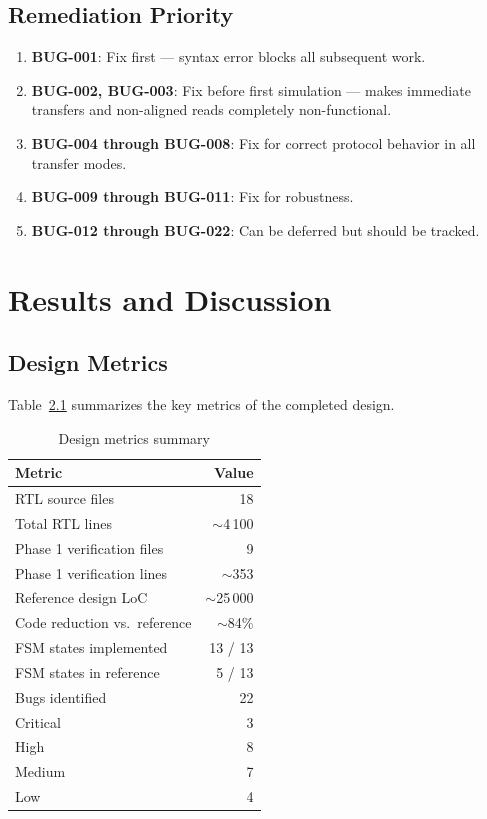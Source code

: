 \documentclass[12pt, a4paper, oneside]{report}
\begin{document}
\section{Remediation Priority}

\begin{enumerate}
  \item \textbf{BUG-001}: Fix first --- syntax error blocks all subsequent work.
  \item \textbf{BUG-002, BUG-003}: Fix before first simulation --- makes immediate
        transfers and non-aligned reads completely non-functional.
  \item \textbf{BUG-004 through BUG-008}: Fix for correct protocol behavior in all
        transfer modes.
  \item \textbf{BUG-009 through BUG-011}: Fix for robustness.
  \item \textbf{BUG-012 through BUG-022}: Can be deferred but should be tracked.
\end{enumerate}

\chapter{Results and Discussion}

\section{Design Metrics}

Table~\ref{tab:metrics} summarizes the key metrics of the completed design.

\begin{table}[H]
\centering
\caption{Design metrics summary}
\label{tab:metrics}
\begin{tabular}{lr}
\toprule
\textbf{Metric} & \textbf{Value} \\
\midrule
RTL source files                 & 18 \\
Total RTL lines                  & $\sim$4\,100 \\
Phase 1 verification files       & 9 \\
Phase 1 verification lines       & $\sim$353 \\
Reference design LoC             & $\sim$25\,000 \\
Code reduction vs.\ reference    & $\sim$84\% \\
FSM states implemented           & 13 / 13 \\
FSM states in reference          & 5 / 13 \\
Bugs identified                  & 22 \\
\quad Critical                   & 3 \\
\quad High                       & 8 \\
\quad Medium                     & 7 \\
\quad Low                        & 4 \\
\bottomrule
\end{tabular}
\end{table}
\end{document}
